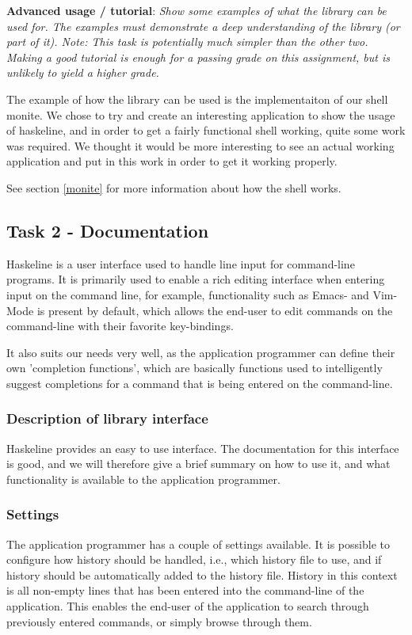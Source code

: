 \documentclass[11pt,a4paper]{article}
\begin{document}
\textbf{Advanced usage / tutorial}: \textit{Show some examples of what the library can be used
for. The examples must demonstrate a deep understanding of the library (or part
of it). Note: This task is potentially much simpler than the other two. Making a
good tutorial is enough for a passing grade on this assignment, but is unlikely
to yield a higher grade.}

The example of how the library can be used is the implementaiton of our shell
monite. We chose to try and create an interesting application to show the usage
of haskeline, and in order to get a fairly functional shell working, quite some
work was required. We thought it would be more interesting to see an actual
working application and put in this work in order to get it working properly.

See section \ref{monite} for more information about how the shell works.

\subsection{Task 2 - Documentation}
Haskeline is a user interface used to handle line input for command-line
programs. It is primarily used to enable a rich editing interface when entering
input on the command line, for example, functionality such as Emacs- and
Vim-Mode is present by default, which allows the end-user to edit commands on
the command-line with their favorite key-bindings.

It also suits our needs very well, as the application programmer can define
their own 'completion functions', which are basically functions used to
intelligently suggest completions for a command that is being entered on the
command-line.

\subsubsection{Description of library interface}
Haskeline provides an easy to use interface. The documentation for this
interface is good, and we will therefore give a brief summary on how to use it,
and what functionality is available to the application programmer.

\subsubsection{Settings}
The application programmer has a couple of settings available. It is possible to
configure how history should be handled, i.e., which history file to use, and if
history should be automatically added to the history file. History in this
context is all non-empty lines that has been entered into the command-line of
the application. This enables the end-user of the application to search through
previously entered commands, or simply browse through them.
\end{document}
